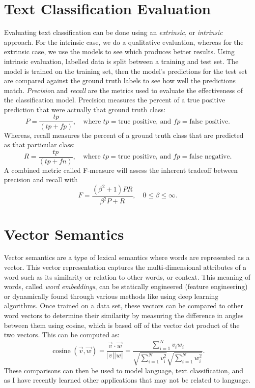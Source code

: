 \documentclass[12pt]{report}
\begin{document}
\section{Text Classification Evaluation}
Evaluating text classification can be done using an \emph{extrinsic}, or
\emph{intrinsic} approach.  For the intrinsic case, we do a
qualitative evaluation, whereas for the extrinsic case, we use the models to see
which produces better results.  Using intrinsic evaluation, labelled data is
split between a training and test set.  The model is trained on the training
set, then the model's predictions for the test set are compared against the
ground truth labels to see how well the predictions match.  \emph{Precision} and
\emph{recall} are the metrics used to evaluate the effectiveness of the
classification model.  Precision measures the percent of a true positive
prediction that were actually that ground truth class:
\[ P = \frac{tp}{(tp + fp)},\quad\text{where }tp = \text{true positive, and }fp
= \text{false positive}. \]
Whereas, recall measures the percent of a ground truth class that are predicted
as that particular class:
\[ R = \frac{tp}{(tp + fn)},\quad\text{where }tp = \text{true positive, and }fp
= \text{false negative}. \]
A combined metric called F-measure will assess the inherent tradeoff between
precision and recall with
\[ F = \frac{(\beta^2 + 1)PR}{\beta^2P + R},\quad 0\leq \beta\leq\infty. \]

\section{Vector Semantics}
Vector semantics are a type of lexical semantics where words are represented as
a vector.  This vector representation captures the multi-dimensional attributes
of a word such as its similarity or relation to other words, or context.  This
meaning of words, called \emph{word embeddings}, can be statically engineered
(feature engineering) or dynamically found through various methods like using
deep learning algorithms.  Once trained on a data set, these vectors can be
compared to other word vectors to determine their similarity by measuring the
difference in angles between them using cosine, which is based off of the vector
dot product of the two vectors.  This can be computed as:
\[
  \operatorname*{cosine}(\vec{v}, \vec{w}) = \frac{\vec{v}\cdot\vec{w}}{\lvert v\rvert\lvert w\rvert}
  = \frac{\displaystyle\sum_{i = 1}^N v_iw_i}{\displaystyle\sqrt{\sum_{i = 1}^N v_i^2}\sqrt{\sum_{i = 1}^N w_i^2}}.
\]
These comparisons can then be used to model language, text classification, and
as I have recently learned other applications that may not be related to language.
\end{document}
